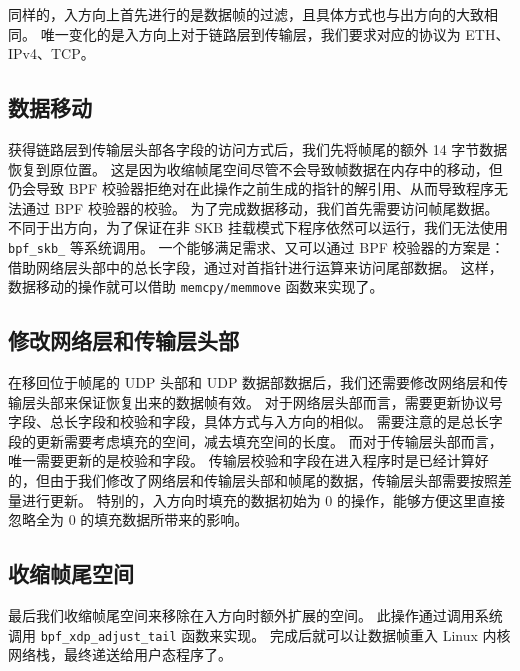 同样的，入方向上首先进行的是数据帧的过滤，且具体方式也与出方向的大致相同。
唯一变化的是入方向上对于链路层到传输层，我们要求对应的协议为 ETH、IPv4、TCP。

\subsection{数据移动}

获得链路层到传输层头部各字段的访问方式后，我们先将帧尾的额外 14 字节数据恢复到原位置。
这是因为收缩帧尾空间尽管不会导致帧数据在内存中的移动，但仍会导致 BPF 校验器拒绝对在此操作之前生成的指针的解引用、从而导致程序无法通过 BPF 校验器的校验。
为了完成数据移动，我们首先需要访问帧尾数据。
不同于出方向，为了保证在非 SKB 挂载模式下程序依然可以运行，我们无法使用 \texttt{bpf\_skb\_\*} 等系统调用。
一个能够满足需求、又可以通过 BPF 校验器的方案是：
借助网络层头部中的总长字段，通过对首指针进行运算来访问尾部数据。
这样，数据移动的操作就可以借助 \texttt{memcpy/memmove} 函数来实现了。

\subsection{修改网络层和传输层头部}

在移回位于帧尾的 UDP 头部和 UDP 数据部数据后，我们还需要修改网络层和传输层头部来保证恢复出来的数据帧有效。
对于网络层头部而言，需要更新协议号字段、总长字段和校验和字段，具体方式与入方向的相似。
需要注意的是总长字段的更新需要考虑填充的空间，减去填充空间的长度。
而对于传输层头部而言，唯一需要更新的是校验和字段。
传输层校验和字段在进入程序时是已经计算好的，但由于我们修改了网络层和传输层头部和帧尾的数据，传输层头部需要按照差量进行更新。
特别的，入方向时填充的数据初始为 0 的操作，能够方便这里直接忽略全为 0 的填充数据所带来的影响。

\subsection{收缩帧尾空间}

最后我们收缩帧尾空间来移除在入方向时额外扩展的空间。
此操作通过调用系统调用 \texttt{bpf\_xdp\_adjust\_tail} 函数来实现。
完成后就可以让数据帧重入 Linux 内核网络栈，最终递送给用户态程序了。
